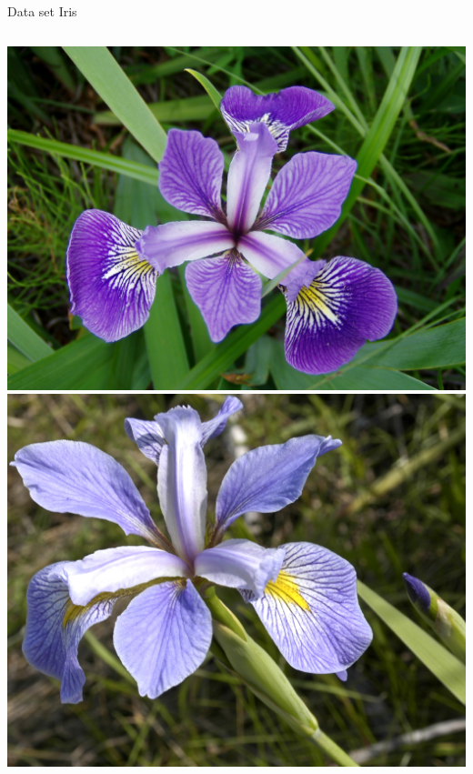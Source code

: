 \documentclass{beamer}
\begin{document}
\begin{frame}{Data set Iris}
\begin{columns}
            \includegraphics[width=\columnwidth]{gfx/iris/Iris_versicolor_3.jpg}
            \includegraphics[width=\columnwidth]{gfx/iris/Iris_virginica.jpg}
        \end{columns}
    \end{frame}
\end{document}
